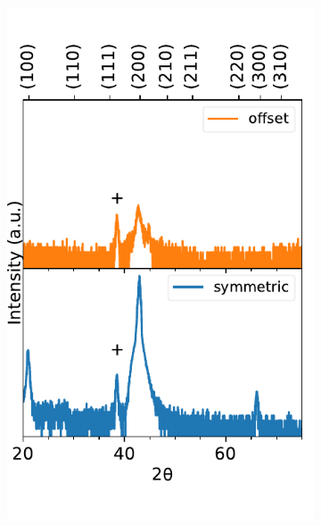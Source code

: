 \begin{figure}
 \centering
    \begin{subfigure}[t]{.45\linewidth}
        \includegraphics[width=\linewidth]{Figures/180316-film-950-2thetaOmegaOffset.pdf}
        \caption{}
        \label{fig:films:xrd:2thetaOmega:offset:950}
    \end{subfigure}\hspace{.125in}
    \begin{subfigure}[t]{.45\linewidth}

\end{subfigure}
\end{figure}

